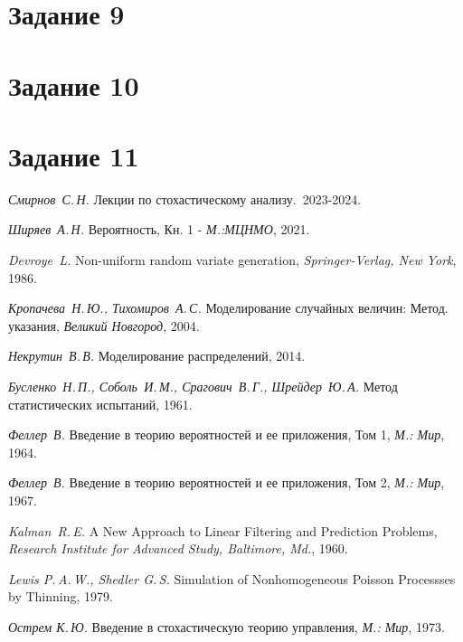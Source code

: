 \documentclass[11pt]{report}
\begin{document}
\section{Задание 9}

\section{Задание 10}

\section{Задание 11}

\begin{thebibliography}{99}

\textit{Смирнов~С.\,Н.}
Лекции по стохастическому анализу.~2023-2024.

\textit{Ширяев~А.\,Н.}
Вероятность, Кн. 1 - \textit{М.:МЦНМО}, 2021.

\textit{Devroye~L.}
Non-uniform random variate generation, \textit{Springer-Verlag, New York}, 1986.

\textit{Кропачева~Н.\,Ю., Тихомиров~А.\,С.}
Моделирование случайных величин: Метод. указания, \textit{Великий Новгород}, 2004.

\textit{Некрутин~В.\,В.}
Моделирование распределений, 2014.

\textit{Бусленко~Н.\,П., Соболь~И.\,М., Срагович~В.\,Г., Шрейдер~Ю.\,А.}
Метод статистических испытаний, 1961.

\textit{Феллер~В.}
Введение в теорию вероятностей и ее приложения, Том 1, \textit{М.: Мир}, 1964.

\textit{Феллер~В.}
Введение в теорию вероятностей и ее приложения, Том 2, \textit{М.: Мир}, 1967.

\textit{Kalman~R.\,E.}
A New Approach to Linear Filtering and Prediction Problems, \textit{Research Institute for Advanced Study, Baltimore, Md.}, 1960.

\textit{Lewis P.\,A.\,W., Shedler G.\,S.}
Simulation of Nonhomogeneous Poisson Processses by Thinning, 1979.

\textit{Острем К.\,Ю.}
Введение в стохастическую теорию управления, \textit{М.: Мир}, 1973.

\end{thebibliography}
\end{document}
